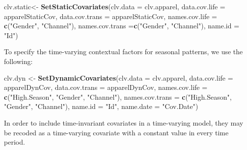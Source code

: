 \documentclass[
]{article}
\newenvironment{Shaded}{\begin{snugshade}}{\end{snugshade}}
\newcommand{\AttributeTok}[1]{\textcolor[rgb]{0.13,0.29,0.53}{#1}}
\newcommand{\FunctionTok}[1]{\textcolor[rgb]{0.13,0.29,0.53}{\textbf{#1}}}
\newcommand{\NormalTok}[1]{#1}
\newcommand{\OtherTok}[1]{\textcolor[rgb]{0.56,0.35,0.01}{#1}}
\newcommand{\StringTok}[1]{\textcolor[rgb]{0.31,0.60,0.02}{#1}}
\begin{document}
\begin{Shaded}
\begin{Highlighting}[]
\NormalTok{clv.static}\OtherTok{\textless{}{-}} \FunctionTok{SetStaticCovariates}\NormalTok{(}\AttributeTok{clv.data =}\NormalTok{ clv.apparel, }
                                      \AttributeTok{data.cov.life =}\NormalTok{ apparelStaticCov, }
                                      \AttributeTok{data.cov.trans =}\NormalTok{ apparelStaticCov,}
                                      \AttributeTok{names.cov.life =} \FunctionTok{c}\NormalTok{(}\StringTok{"Gender"}\NormalTok{, }\StringTok{"Channel"}\NormalTok{), }
                                      \AttributeTok{names.cov.trans =}\FunctionTok{c}\NormalTok{(}\StringTok{"Gender"}\NormalTok{, }\StringTok{"Channel"}\NormalTok{), }
                                      \AttributeTok{name.id =} \StringTok{"Id"}\NormalTok{)}
\end{Highlighting}
\end{Shaded}

To specify the time-varying contextual factors for seasonal patterns, we
use the following:

\begin{Shaded}
\begin{Highlighting}[]
\NormalTok{clv.dyn }\OtherTok{\textless{}{-}} \FunctionTok{SetDynamicCovariates}\NormalTok{(}\AttributeTok{clv.data =}\NormalTok{ clv.apparel, }
                                     \AttributeTok{data.cov.life =}\NormalTok{ apparelDynCov,}
                                     \AttributeTok{data.cov.trans =}\NormalTok{ apparelDynCov, }
                                     \AttributeTok{names.cov.life =} \FunctionTok{c}\NormalTok{(}\StringTok{"High.Season"}\NormalTok{, }\StringTok{"Gender"}\NormalTok{, }\StringTok{"Channel"}\NormalTok{), }
                                     \AttributeTok{names.cov.trans =} \FunctionTok{c}\NormalTok{(}\StringTok{"High.Season"}\NormalTok{, }\StringTok{"Gender"}\NormalTok{, }\StringTok{"Channel"}\NormalTok{), }
                                     \AttributeTok{name.id =} \StringTok{"Id"}\NormalTok{,}
                                     \AttributeTok{name.date =} \StringTok{"Cov.Date"}\NormalTok{)}
\end{Highlighting}
\end{Shaded}

In order to include time-invariant covariates in a time-varying model,
they may be recoded as a time-varying covariate with a constant value in
every time period.
\end{document}
